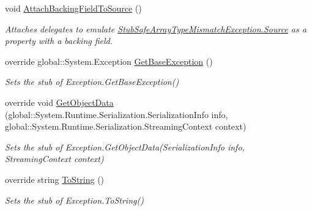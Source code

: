 \begin{DoxyCompactItemize}
void \hyperlink{class_system_1_1_runtime_1_1_interop_services_1_1_fakes_1_1_stub_safe_array_type_mismatch_exception_ae230d26bfc00bba5be2d9739a60eb6a8}{Attach\-Backing\-Field\-To\-Source} ()
\begin{DoxyCompactList}\small\item\em Attaches delegates to emulate \hyperlink{class_system_1_1_runtime_1_1_interop_services_1_1_fakes_1_1_stub_safe_array_type_mismatch_exception_a5d0d9f5bf28ec4ef59492827cc979052}{Stub\-Safe\-Array\-Type\-Mismatch\-Exception.\-Source} as a property with a backing field.\end{DoxyCompactList}\item 
override global\-::\-System.\-Exception \hyperlink{class_system_1_1_runtime_1_1_interop_services_1_1_fakes_1_1_stub_safe_array_type_mismatch_exception_a7514fd8d1b2fccfad0e70fb90c12c720}{Get\-Base\-Exception} ()
\begin{DoxyCompactList}\small\item\em Sets the stub of Exception.\-Get\-Base\-Exception()\end{DoxyCompactList}\item 
override void \hyperlink{class_system_1_1_runtime_1_1_interop_services_1_1_fakes_1_1_stub_safe_array_type_mismatch_exception_ad88d1933a9a7bd20c22113d3a726dfdf}{Get\-Object\-Data} (global\-::\-System.\-Runtime.\-Serialization.\-Serialization\-Info info, global\-::\-System.\-Runtime.\-Serialization.\-Streaming\-Context context)
\begin{DoxyCompactList}\small\item\em Sets the stub of Exception.\-Get\-Object\-Data(\-Serialization\-Info info, Streaming\-Context context)\end{DoxyCompactList}\item 
override string \hyperlink{class_system_1_1_runtime_1_1_interop_services_1_1_fakes_1_1_stub_safe_array_type_mismatch_exception_a0d60ba0f9872c4fddd5cac1bcfd64693}{To\-String} ()
\begin{DoxyCompactList}\small\item\em Sets the stub of Exception.\-To\-String()\end{DoxyCompactList}\end{DoxyCompactItemize}
